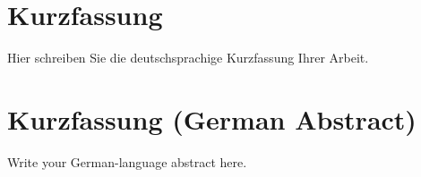 \newpage
\ifnum{}
  \chapter*{Kurzfassung}
  Hier schreiben Sie die deutschsprachige Kurzfassung Ihrer Arbeit.
\else
  \chapter*{Kurzfassung (German Abstract)}
  Write your German-language abstract here.
\fi
